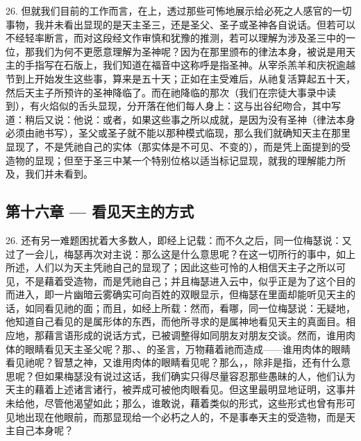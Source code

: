 26. 但就我们目前的工作而言，在上，透过那些可怖地展示给必死之人感官的一切事物，我并未看出显现的是天主圣三，还是圣父、圣子或圣神各自说话。但若可以不经轻率断言，而对这段经文作审慎和犹豫的推测，若可以理解为涉及圣三中的一位，那我们为何不更愿意理解为圣神呢？因为在那里颁布的律法本身，被说是用天主的手指写在石版上，我们知道在福音中这称呼是指圣神。从宰杀羔羊和庆祝逾越节到上开始发生这些事，算来是五十天；正如在主受难后，从祂复活算起五十天，然后天主子所预许的圣神降临了。而在祂降临的那次（我们在宗徒大事录中读到），有火焰似的舌头显现，分开落在他们每人身上：这与出谷纪吻合，其中写道：稍后又说：他说：或者，如果这些事之所以成就，是因为没有圣神（律法本身必须由祂书写），圣父或圣子就不能以那种模式临现，那么我们就确知天主在那里显现了，不是凭祂自己的实体（那实体是不可见、不变的），而是凭上面提到的受造物的显现；但至于圣三中某一个特别位格以适当标记显现，就我的理解能力所及，我们并未看到。\par


\subsection{第十六章 — 看见天主的方式}

26. 还有另一难题困扰着大多数人，即经上记载：而不久之后，同一位梅瑟说：又过了一会儿，梅瑟再次对主说：那么这是什么意思呢？在这一切所行的事中，如上所述，人们以为天主凭祂自己的显现了；因此这些可怜的人相信天主子之所以可见，不是藉着受造物，而是凭祂自己；并且梅瑟进入云中，似乎正是为了这个目的而进入，即一片幽暗云雾确实可向百姓的双眼显示，但梅瑟在里面却能听见天主的话，如同看见祂的面；而且，如经上所载：然而，看哪，同一位梅瑟说：无疑地，他知道自己看见的是属形体的东西，而他所寻求的是属神地看见天主的真面目。相应地，那藉言语形成的说话方式，已被调整得如同朋友对朋友交谈。然而，谁用肉体的眼睛看见天主圣父呢？那、、的圣言，万物藉着祂而造成——谁用肉体的眼睛看见祂呢？智慧之神，又谁用肉体的眼睛看见呢？那么，，除非是指，还有什么意思呢？但如果梅瑟没有说过这话，我们确实只得尽量容忍那些愚昧的人，他们认为天主的藉着上述诸言诸行，被弄成可被他肉眼看见。但这里最明显地证明，这事并未给他，尽管他渴望如此；那么，谁敢说，藉着类似的形式，这些形式也曾有形可见地出现在他眼前，而那显现给一个必朽之人的，不是事奉天主的受造物，而是天主自己本身呢？\par

